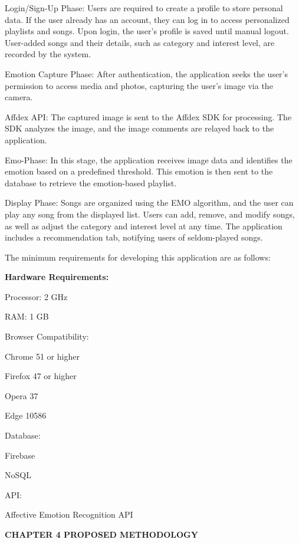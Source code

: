 \documentclass[a4paper]{article}
\begin{document}
Login/Sign-Up Phase: Users are required to create a profile to store personal data. If the user already has an account,
they can log in to access personalized playlists and songs. Upon login, the user's profile is saved until manual
logout. User-added songs and their details, such as category and interest level, are recorded by the system.

Emotion Capture Phase: After authentication, the application seeks the user's permission to access media and photos,
capturing the user's image via the camera.

Affdex API: The captured image is sent to the Affdex SDK for processing. The SDK analyzes the image, and the image
comments are relayed back to the application.

Emo-Phase: In this stage, the application receives image data and identifies the emotion based on a predefined
threshold. This emotion is then sent to the database to retrieve the emotion-based playlist.

Display Phase: Songs are organized using the EMO algorithm, and the user can play any song from the displayed list.
Users can add, remove, and modify songs, as well as adjust the category and interest level at any time. The application
includes a recommendation tab, notifying users of seldom-played songs.


\bigskip


The minimum requirements for developing this application are as follows:


\bigskip

\textbf{Hardware Requirements:}

Processor: 2 GHz

RAM: 1 GB

Browser Compatibility:


\bigskip

Chrome 51 or higher

Firefox 47 or higher

Opera 37

Edge 10586

Database:


\bigskip

Firebase

NoSQL

API:


\bigskip

Affective Emotion Recognition API 

\clearpage\setcounter{page}{1}\pagestyle{Convertedix}
{\bfseries
\hypertarget{1ksv4uv}{}CHAPTER 4 PROPOSED METHODOLOGY}
\end{document}
